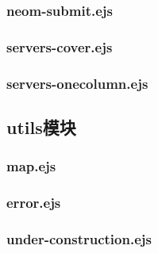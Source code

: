 \subsubsection{neom-submit.ejs}

\subsubsection{servers-cover.ejs}

\subsubsection{servers-onecolumn.ejs}

\subsection{utils模块}
\subsubsection{map.ejs}

\subsubsection{error.ejs}

\subsubsection{under-construction.ejs}


% 
% 
